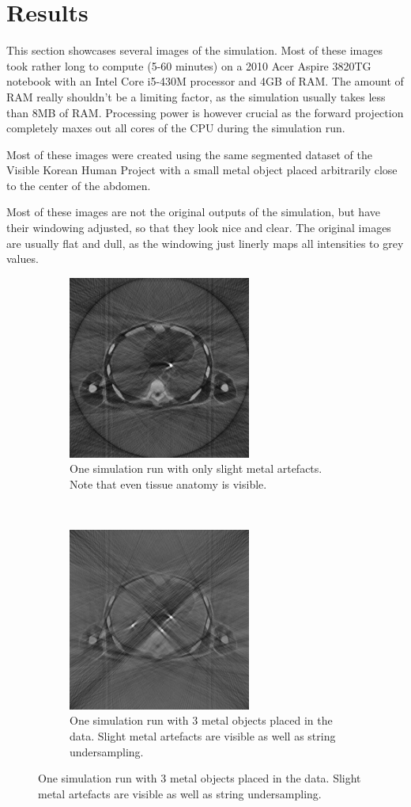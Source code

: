\chapter{Results}
\par This section showcases several images of the simulation. Most of these images took rather long to compute (5-60 minutes) on a 2010 Acer Aspire 3820TG notebook with an Intel Core i5-430M processor and 4GB of RAM. The amount of RAM really shouldn't be a limiting factor, as the simulation usually takes less than 8MB of RAM. Processing power is however crucial as the forward projection completely maxes out all cores of the CPU during the simulation run.
\par Most of these images were created using the same segmented dataset of the Visible Korean Human Project\cite{visibleKorean} with a small metal object placed arbitrarily close to the center of the abdomen.
\par Most of these images are not the original outputs of the simulation, but have their windowing adjusted, so that they look nice and clear. The original images are usually flat and dull, as the windowing just linerly maps all intensities to grey values.
\begin{figure}[h!]
	\centering
	\begin{subfigure}[h]{0.45\textwidth}
		\centering
		\includegraphics[height=6cm]{images/sim01.png}
		\caption{One simulation run with only slight metal artefacts. Note that even tissue anatomy is visible.}
		\label{sim01}
	\end{subfigure}%
	~
	\begin{subfigure}[h]{0.45\textwidth}
		\centering
		\includegraphics[height=6cm]{images/sim02.png}
		\caption{One simulation run with 3 metal objects placed in the data. Slight metal artefacts are visible as well as string undersampling.}
		\label{sim02}
	\end{subfigure}%
\end{figure}

